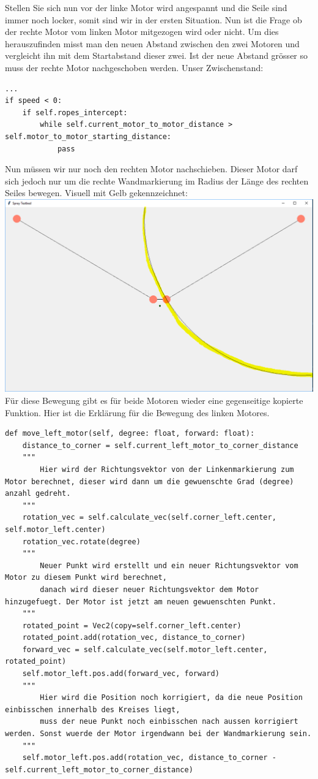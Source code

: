 \documentclass[12pt]{article}
\begin{document}
Stellen Sie sich nun vor der linke Motor wird angespannt und die Seile sind immer noch locker, somit sind wir in der ersten Situation.
Nun ist die Frage ob der rechte Motor vom linken Motor mitgezogen wird oder nicht. Um dies herauszufinden misst man den neuen Abstand zwischen den zwei Motoren und vergleicht ihn mit dem Startabstand dieser zwei. Ist der neue Abstand grösser so muss der rechte Motor nachgeschoben werden. Unser Zwischenstand:
\begin{lstlisting}
...
if speed < 0:
	if self.ropes_intercept:
		while self.current_motor_to_motor_distance > self.motor_to_motor_starting_distance:
			pass
\end{lstlisting}
Nun müssen wir nur noch den rechten Motor nachschieben. Dieser Motor darf sich jedoch nur um die rechte Wandmarkierung im Radius der Länge des rechten Seiles bewegen. Visuell mit Gelb gekennzeichnet:\newline
\includegraphics[width=1\textwidth]{motor_wanderlinie.PNG}
Für diese Bewegung gibt es für beide Motoren wieder eine gegenseitige kopierte Funktion. Hier ist die Erklärung für die Bewegung des linken Motores.
\begin{lstlisting}
def move_left_motor(self, degree: float, forward: float):
	distance_to_corner = self.current_left_motor_to_corner_distance
	"""
		Hier wird der Richtungsvektor von der Linkenmarkierung zum Motor berechnet, dieser wird dann um die gewuenschte Grad (degree) anzahl gedreht.
	"""
	rotation_vec = self.calculate_vec(self.corner_left.center, self.motor_left.center)
	rotation_vec.rotate(degree)
	"""
		Neuer Punkt wird erstellt und ein neuer Richtungsvektor vom Motor zu diesem Punkt wird berechnet,
		danach wird dieser neuer Richtungsvektor dem Motor hinzugefuegt. Der Motor ist jetzt am neuen gewuenschten Punkt.
	"""
	rotated_point = Vec2(copy=self.corner_left.center)
	rotated_point.add(rotation_vec, distance_to_corner)
	forward_vec = self.calculate_vec(self.motor_left.center, rotated_point)
	self.motor_left.pos.add(forward_vec, forward)
	"""
		Hier wird die Position noch korrigiert, da die neue Position einbisschen innerhalb des Kreises liegt,
		muss der neue Punkt noch einbisschen nach aussen korrigiert werden. Sonst wuerde der Motor irgendwann bei der Wandmarkierung sein.
	"""
	self.motor_left.pos.add(rotation_vec, distance_to_corner - self.current_left_motor_to_corner_distance)
\end{lstlisting}
\end{document}
